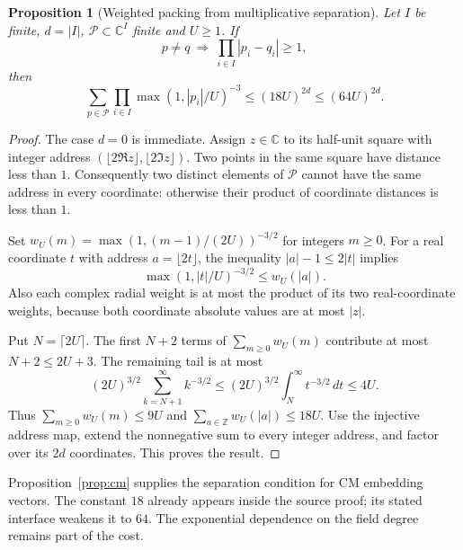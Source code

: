 \documentclass[11pt,letterpaper]{article}
\newtheorem{proposition}[theorem]{Proposition}
\theoremstyle{definition}
\theoremstyle{remark}
\newcommand{\C}{\mathbb C}
\newcommand{\Z}{\mathbb Z}
\numberwithin{equation}{section}
\begin{document}
\begin{proposition}[Weighted packing from multiplicative separation]\label{prop:packing}
Let $I$ be finite, $d=|I|$, $\mathcal P\subset\C^I$ finite and $U\ge1$. If
\[
 p\ne q\ \Longrightarrow\ \prod_{i\in I}|p_i-q_i|\ge1,
\]
then
\[
 \sum_{p\in\mathcal P}\prod_{i\in I}\max(1,|p_i|/U)^{-3}
 \le(18U)^{2d}\le(64U)^{2d}.
\]
\end{proposition}
\begin{proof}
The case $d=0$ is immediate. Assign $z\in\C$ to its half-unit square with integer address $(\lfloor2\Re z\rfloor,\lfloor2\Im z\rfloor)$. Two points in the same square have distance less than $1$. Consequently two distinct elements of $\mathcal P$ cannot have the same address in every coordinate: otherwise their product of coordinate distances is less than $1$.

Set $w_U(m)=\max(1,(m-1)/(2U))^{-3/2}$ for integers $m\ge0$. For a real coordinate $t$ with address $a=\lfloor2t\rfloor$, the inequality $|a|-1\le2|t|$ implies
\[
 \max(1,|t|/U)^{-3/2}\le w_U(|a|).
\]
Also each complex radial weight is at most the product of its two real-coordinate weights, because both coordinate absolute values are at most $|z|$.

Put $N=\lceil2U\rceil$. The first $N+2$ terms of $\sum_{m\ge0}w_U(m)$ contribute at most $N+2\le2U+3$. The remaining tail is at most
\[
 (2U)^{3/2}\sum_{k=N+1}^\infty k^{-3/2}
 \le (2U)^{3/2}\int_N^\infty t^{-3/2}\,dt\le4U.
\]
Thus $\sum_{m\ge0}w_U(m)\le9U$ and $\sum_{a\in\Z}w_U(|a|)\le18U$. Use the injective address map, extend the nonnegative sum to every integer address, and factor over its $2d$ coordinates. This proves the result.
\end{proof}

Proposition~\ref{prop:cm} supplies the separation condition for CM embedding vectors. The constant $18$ already appears inside the source proof; its stated interface weakens it to $64$. The exponential dependence on the field degree remains part of the cost.
\end{document}
